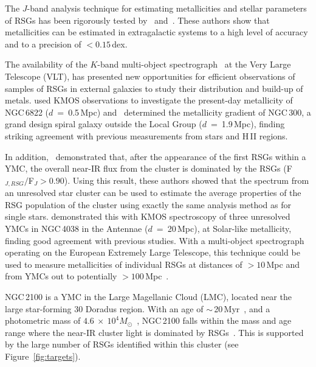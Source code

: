 \documentclass[useAMS,usenatbib]{mn2e}
\def\2{\footnotesize II\normalsize}
\begin{document}
The $J$-band analysis technique for estimating metallicities and stellar parameters of RSGs has been rigorously tested by~\cite{2014ApJ...788...58G} and~\cite{2015ApJ...806...21D}.
These authors show that metallicities can be estimated in extragalactic systems to a high level of accuracy and to a precision of $<0.15$\,dex.

The availability of the $K$-band multi-object spectrograph~\citep[KMOS;][]{2013Msngr.151...21S} at the Very Large Telescope (VLT), has presented new opportunities for efficient observations of samples of RSGs in external galaxies to study their distribution and build-up of metals.
\cite{2015ApJ...803...14P} used KMOS observations to investigate the present-day metallicity of NGC\,6822 ($d$~=~0.5\,Mpc) and~\cite{2015ApJ...805..182G} determined the metallicity gradient of NGC\,300, a grand design spiral galaxy outside the Local Group ($d$~=~1.9\,Mpc), finding striking agreement with previous measurements from stars and H\,\2 regions.

In addition,~\citet{2013MNRAS.430L..35G} demonstrated that, after the appearance of the first RSGs within a YMC, the overall near-IR flux from the cluster is dominated by the RSGs (F$_{J, RSG}/$F$_{J}>0.90$).
Using this result, these authors showed that the spectrum from an unresolved star cluster can be used to estimate the average properties of the RSG population of the cluster using exactly the same analysis method as for single stars.
\citet{2015ApJ...812..160L} demonstrated this with KMOS spectroscopy of three unresolved YMCs in NGC\,4038 in the Antennae ($d$~=~20\,Mpc), at Solar-like metallicity, finding good agreement with previous studies.
With a multi-object spectrograph operating on the European Extremely Large Telescope, this technique could be used to measure metallicities of individual RSGs at distances of $>10\,$Mpc and from YMCs out to potentially $>100\,$Mpc~\citep{2011A&A...527A..50E}.

NGC\,2100 is a YMC in the Large Magellanic Cloud (LMC), located near the large star-forming 30 Doradus region.
With an age of $\sim$\,20\,Myr~\citep{1991ApJS...76..185E,2015A&A...575A..62N}, and a photometric mass of $4.6~\times~10^4M_{\odot}$~\citep[assuming~\cite{1966AJ.....71...64K} profiles]{2005ApJS..161..304M}, NGC\,2100 falls within the mass and age range where the near-IR cluster light is dominated by RSGs~\citep{2013MNRAS.430L..35G}.
This is supported by the large number of RSGs identified within this cluster (see Figure~\ref{fig:targets}).
\end{document}
